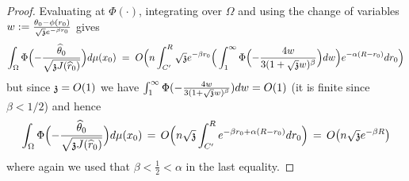 \begin{proof}
Evaluating at $\Phi(\cdot)$, integrating over $\Omega$ and using the change of variables $w:=\frac{\theta_0-\phi(r_0)}{\sqrt{\ss}e^{-\beta r_0}}$ gives
\[\int_{\Omega}\Phi\Big({-}\frac{\hatt}{\sqrt{\ss \JJ(\hatr)}}\Big)d\mu(x_0)\;=\;O\Big(n\int_{C'}^R\sqrt{\ss}e^{-\beta r_0}\Big(\int_{1}^\infty\Phi\Big({-}\frac{4w}{3(1+\sqrt{\ss}w)^{\beta}}\Big)dw\Big)e^{-\alpha(R-r_0)}dr_0\Big)\]
but since $\ss=O(1)$ we have $\int_{1}^\infty\Phi(-\tfrac{4w}{3(1+\sqrt{\ss}w)^{\beta}})dw=O(1)$ (it is finite since $\beta<1/2$) and hence
\[\int_{\Omega}\Phi\Big({-}\frac{\hatt}{\sqrt{\ss \JJ(\hatr)}}\Big)d\mu(x_0)\,=\,O\Big(n\sqrt{\ss}\int_{C'}^Re^{-\beta r_0+\alpha(R-r_0)}dr_0\Big)\,=\,O\big(n\sqrt{\ss}e^{-\beta R}\big)\]
where again we used that $\beta<\frac{1}{2}<\alpha$ in the last equality. %
\end{proof}


